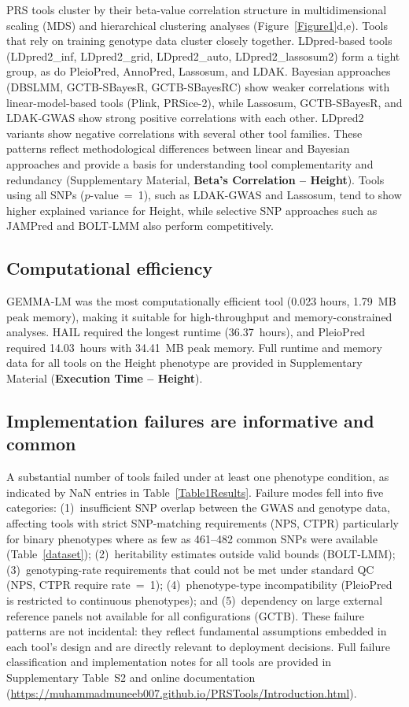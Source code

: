 \documentclass[pdflatex,sn-basic]{sn-jnl}
\begin{document}
PRS tools cluster by their beta-value correlation structure in multidimensional scaling (MDS) and hierarchical clustering analyses (Figure~\ref{Figure1}d,e). Tools that rely on training genotype data cluster closely together. LDpred-based tools (LDpred2\_inf, LDpred2\_grid, LDpred2\_auto, LDpred2\_lassosum2) form a tight group, as do PleioPred, AnnoPred, Lassosum, and LDAK. Bayesian approaches (DBSLMM, GCTB-SBayesR, GCTB-SBayesRC) show weaker correlations with linear-model-based tools (Plink, PRSice-2), while Lassosum, GCTB-SBayesR, and LDAK-GWAS show strong positive correlations with each other. LDpred2 variants show negative correlations with several other tool families. These patterns reflect methodological differences between linear and Bayesian approaches and provide a basis for understanding tool complementarity and redundancy (Supplementary Material, \textbf{Beta's Correlation -- Height}). Tools using all SNPs ($p$-value~=~1), such as LDAK-GWAS and Lassosum, tend to show higher explained variance for Height, while selective SNP approaches such as JAMPred and BOLT-LMM also perform competitively.

\subsection*{Computational efficiency}

GEMMA-LM was the most computationally efficient tool (0.023 hours, 1.79~MB peak memory), making it suitable for high-throughput and memory-constrained analyses. HAIL required the longest runtime (36.37~hours), and PleioPred required 14.03~hours with 34.41~MB peak memory. Full runtime and memory data for all tools on the Height phenotype are provided in Supplementary Material (\textbf{Execution Time -- Height}).

\subsection*{Implementation failures are informative and common}

A substantial number of tools failed under at least one phenotype condition, as indicated by NaN entries in Table~\ref{Table1Results}. Failure modes fell into five categories: (1)~insufficient SNP overlap between the GWAS and genotype data, affecting tools with strict SNP-matching requirements (NPS, CTPR) particularly for binary phenotypes where as few as 461--482 common SNPs were available (Table~\ref{dataset}); (2)~heritability estimates outside valid bounds (BOLT-LMM); (3)~genotyping-rate requirements that could not be met under standard QC (NPS, CTPR require rate~=~1); (4)~phenotype-type incompatibility (PleioPred is restricted to continuous phenotypes); and (5)~dependency on large external reference panels not available for all configurations (GCTB). These failure patterns are not incidental: they reflect fundamental assumptions embedded in each tool's design and are directly relevant to deployment decisions. Full failure classification and implementation notes for all tools are provided in Supplementary Table~S2 and online documentation (\url{https://muhammadmuneeb007.github.io/PRSTools/Introduction.html}).
\end{document}
